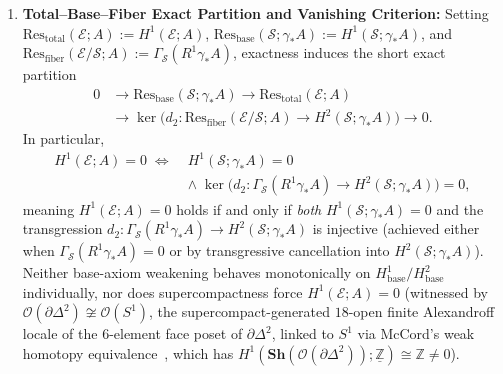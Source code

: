 \begin{theorem}
\begin{enumerate}
  \item \textbf{Total--Base--Fiber Exact Partition and Vanishing Criterion:} Setting $\mathrm{Res}_{\mathrm{total}}(\mathcal{E}; A) := H^1(\mathcal{E}; A)$, $\mathrm{Res}_{\mathrm{base}}(\mathcal{S}; \gamma_* A) := H^1(\mathcal{S}; \gamma_* A)$, and $\mathrm{Res}_{\mathrm{fiber}}(\mathcal{E}/\mathcal{S}; A) := \Gamma_{\mathcal{S}}(R^1\gamma_* A)$, exactness induces the short exact partition
  \[
    \begin{aligned}
      0 &\longrightarrow \mathrm{Res}_{\mathrm{base}}(\mathcal{S}; \gamma_* A) \longrightarrow \mathrm{Res}_{\mathrm{total}}(\mathcal{E}; A) \\
      &\longrightarrow \ker\bigl(d_2 : \mathrm{Res}_{\mathrm{fiber}}(\mathcal{E}/\mathcal{S}; A) \to H^2(\mathcal{S}; \gamma_* A)\bigr) \longrightarrow 0.
    \end{aligned}
  \]
  In particular,
  \[
    \begin{aligned}
      H^1(\mathcal{E}; A) = 0 \;\iff\;& H^1(\mathcal{S}; \gamma_* A) = 0 \\
      &\wedge\; \ker\bigl(d_2 : \Gamma_{\mathcal{S}}(R^1\gamma_* A) \to H^2(\mathcal{S}; \gamma_* A)\bigr) = 0,
    \end{aligned}
  \]
  meaning $H^1(\mathcal{E}; A) = 0$ holds if and only if \emph{both} $H^1(\mathcal{S}; \gamma_* A) = 0$ and the transgression $d_2 : \Gamma_{\mathcal{S}}(R^1\gamma_* A) \to H^2(\mathcal{S}; \gamma_* A)$ is injective (achieved either when $\Gamma_{\mathcal{S}}(R^1\gamma_* A) = 0$ or by transgressive cancellation into $H^2(\mathcal{S}; \gamma_* A)$). Neither base-axiom weakening behaves monotonically on $H^1_{\mathrm{base}}/H^2_{\mathrm{base}}$ individually, nor does supercompactness force $H^1(\mathcal{E}; A) = 0$ (witnessed by $\mathcal{O}(\partial\Delta^2) \not\cong \mathcal{O}(S^1)$, the supercompact-generated $18$-open finite Alexandroff locale of the $6$-element face poset of $\partial\Delta^2$, linked to $S^1$ via McCord's weak homotopy equivalence~\cite[Theorem~1]{McCord66}, which has $H^1(\mathbf{Sh}(\mathcal{O}(\partial\Delta^2)); \underline{\mathbb{Z}}) \cong \mathbb{Z} \neq 0$).

\end{enumerate}

\end{theorem}

